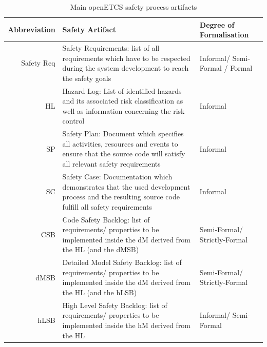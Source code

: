 \documentclass{template/openetcs_article}
\begin{document}
\begin{table}[htbp]
  \centering
  \caption{Main openETCS safety process artifacts}
    \begin{tabular}{r|p{8cm}|p{4cm}}
    \textbf{Abbreviation} & \textbf{Safety Artifact} & \textbf{Degree of Formalisation}\\
    \hline
    Safety Req & Safety Requirements: list of all requirements which have to be respected during the system development to reach the safety goals & Informal/ Semi-Formal / Formal \\
    HL    & Hazard Log: List of identified hazards and its associated risk classification as well as information concerning the risk control & Informal \\
    SP    & Safety Plan: Document which specifies all activities, resources and events to ensure that the source code will satisfy all relevant safety requirements & Informal \\
    SC    & Safety Case: Documentation which demonstrates that the used development process and the resulting source code fulfill all safety requirements & Informal \\
    CSB   & Code Safety Backlog: list of requirements/ properties to be implemented inside the dM derived from  the HL (and the dMSB) & Semi-Formal/ Strictly-Formal \\
    dMSB  & Detailed Model Safety Backlog: list of requirements/ properties to be implemented inside the dM derived from the HL (and  the hLSB) & Semi-Formal/ Strictly-Formal \\
    hLSB  & High Level Safety Backlog: list of requirements/ properties to be implemented inside the hM derived from the HL & Informal/ Semi-Formal \\
    \end{tabular}%
  \label{tab:openETCS-Safety-artifacts}%
\end{table}%
\end{document}
